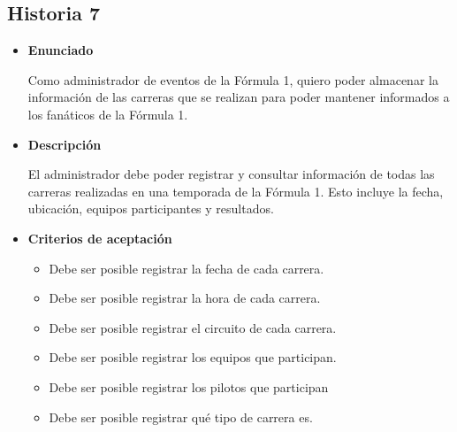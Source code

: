 \documentclass{article}
\begin{document}
	\subsection{Historia 7}
	\begin{itemize}
		
		\item \large{\textbf{Enunciado}}
		\begin{description}
			Como administrador de eventos de la Fórmula 1, quiero poder almacenar la información de las carreras que se realizan para poder mantener informados a los fanáticos de la Fórmula 1.
			
		\end{description}
		
		\item \large{\textbf{Descripción}}
		\begin{description}
			El administrador debe poder registrar y consultar información de todas las carreras realizadas en una temporada de la Fórmula 1. Esto incluye la fecha, ubicación, equipos participantes y resultados. 
			
		\end{description}
		
		\item \large{\textbf{Criterios de aceptación}}
		\begin{itemize}
			\item Debe ser posible registrar la fecha de cada carrera.
			\item Debe ser posible registrar la hora de cada carrera.
			\item Debe ser posible registrar el circuito de cada carrera. 
			\item Debe ser posible registrar los equipos que participan.
			\item Debe ser posible registrar los pilotos que participan
			\item Debe ser posible registrar qué tipo de carrera es. 
			
		\end{itemize}
		
	\end{itemize}
	
\end{document}
